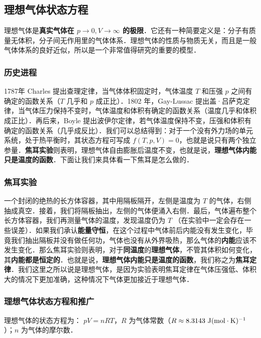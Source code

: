 
\subsection{理想气体状态方程}

理想气体是\textbf{真实气体在 $p\rightarrow 0,V\rightarrow \infty$ 的极限}．它还有一种简要定义是：分子有质量无体积，分子间无作用里的气体体系．理想气体的性质与物质无关，而且是一般气体体系的良好近似，所以是一个非常值得研究的重要的模型．
\subsubsection{历史进程}
1787年 Charles 提出查理定律，当气体体积固定时，气体温度 $T$ 和压强 $p$ 之间有确定的函数关系（$T$ 几乎和 $p$ 成正比）．1802 年，Gay-Lussac 提出盖·吕萨克定律，当气体压力保持不变时，气体温度和体积有确定的函数关系（温度几乎和体积成正比）．再后来，Boyle 提出波伊尔定律，若气体温度保持不变，压强和体积有确定的函数关系（几乎成反比）．我们可以总结得到：对于一个没有外力场的单元系统，处于热平衡时，其状态方程可写成 $f(T,p,V)=0$，也就是说只有两个独立参量．\textbf{焦耳实验}则表明，理想气体自由膨胀后温度不变，也就是说，\textbf{理想气体内能只是温度的函数}．下面让我们来具体看一下焦耳是怎么做的．
\subsubsection{焦耳实验}
一个封闭的绝热的长方体容器，其中用隔板隔开，左侧是温度为 $T$ 的气体，右侧抽成真空．接着，我们将隔板抽出，左侧的气体便涌入右侧．最后，气体遍布整个长方体容器，我们再测量气体的温度，发现温度仍为 $T$ （在实验中一定会存在一些误差）．如果我们承认\textbf{能量守恒}，在这个过程中气体前后内能没有发生变化，毕竟我们抽出隔板并没有做任何功，气体也没有从外界吸热，那么气体的\textbf{内能}应该不发生变化．那么焦耳实验则表明，对于\textbf{同温度}的\textbf{理想气体}，不管其体积如何变化，其\textbf{内能都是恒定的}．也就是说，\textbf{理想气体内能只是温度的函数}，我们称之为\textbf{焦耳定律}．我们这里之所以说是理想气体，是因为实验表明焦耳定律在气体压强低、体积大的情况下更加准确，这种情况下气体更加接近于理想气体．


\subsubsection{理想气体状态方程和推广}
理想气体的状态方程为： $pV=nRT$，$R$ 为气体常数（$R\approx 8.3143\ \rm{J}(\rm{mol\cdot K})^{-1}$）；$n$ 为气体的摩尔数．

